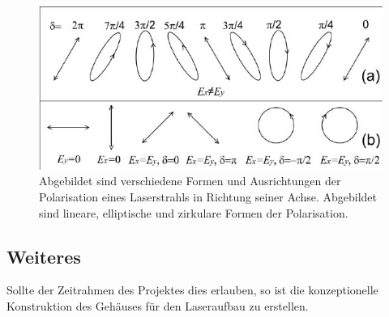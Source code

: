 \begin{figure}[H]
    \centering
    \includegraphics[scale=0.5, trim={5mm 10mm 0 14mm},clip]{98_images/laser_polarization_forms_directions.jpg}
    \caption{Abgebildet sind verschiedene Formen und Ausrichtungen der Polarisation eines Laserstrahls in Richtung seiner Achse. Abgebildet sind lineare, elliptische und zirkulare Formen der Polarisation.}
    \label{fig:polarization_forms_directions}
\end{figure}
\subsection{Weiteres}
Sollte der Zeitrahmen des Projektes dies erlauben, so ist die konzeptionelle Konstruktion des Gehäuses für den Laseraufbau zu erstellen.\\
